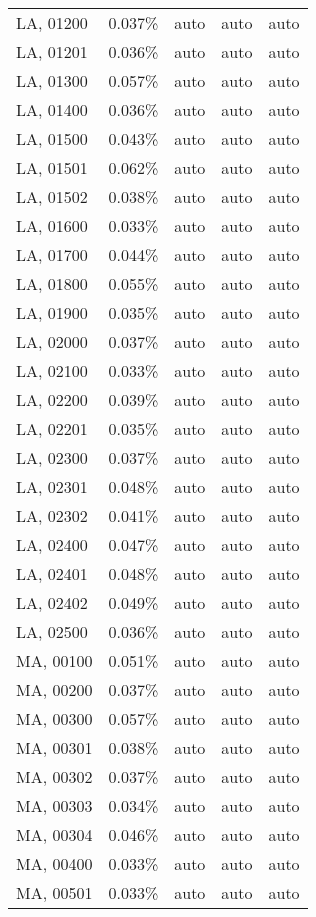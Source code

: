 \begin{longtable}[]{@{}lllll@{}}
LA, 01200 & 0.037\% & auto & auto & auto \\
LA, 01201 & 0.036\% & auto & auto & auto \\
LA, 01300 & 0.057\% & auto & auto & auto \\
LA, 01400 & 0.036\% & auto & auto & auto \\
LA, 01500 & 0.043\% & auto & auto & auto \\
LA, 01501 & 0.062\% & auto & auto & auto \\
LA, 01502 & 0.038\% & auto & auto & auto \\
LA, 01600 & 0.033\% & auto & auto & auto \\
LA, 01700 & 0.044\% & auto & auto & auto \\
LA, 01800 & 0.055\% & auto & auto & auto \\
LA, 01900 & 0.035\% & auto & auto & auto \\
LA, 02000 & 0.037\% & auto & auto & auto \\
LA, 02100 & 0.033\% & auto & auto & auto \\
LA, 02200 & 0.039\% & auto & auto & auto \\
LA, 02201 & 0.035\% & auto & auto & auto \\
LA, 02300 & 0.037\% & auto & auto & auto \\
LA, 02301 & 0.048\% & auto & auto & auto \\
LA, 02302 & 0.041\% & auto & auto & auto \\
LA, 02400 & 0.047\% & auto & auto & auto \\
LA, 02401 & 0.048\% & auto & auto & auto \\
LA, 02402 & 0.049\% & auto & auto & auto \\
LA, 02500 & 0.036\% & auto & auto & auto \\
MA, 00100 & 0.051\% & auto & auto & auto \\
MA, 00200 & 0.037\% & auto & auto & auto \\
MA, 00300 & 0.057\% & auto & auto & auto \\
MA, 00301 & 0.038\% & auto & auto & auto \\
MA, 00302 & 0.037\% & auto & auto & auto \\
MA, 00303 & 0.034\% & auto & auto & auto \\
MA, 00304 & 0.046\% & auto & auto & auto \\
MA, 00400 & 0.033\% & auto & auto & auto \\
MA, 00501 & 0.033\% & auto & auto & auto \\

\end{longtable}
